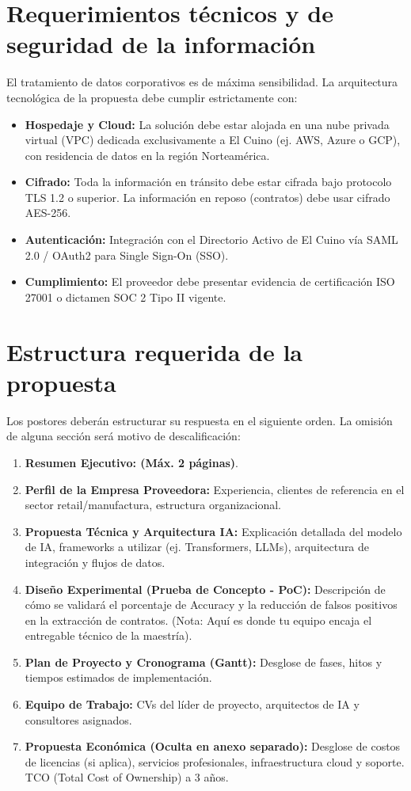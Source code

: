 \documentclass[12pt]{article}
\begin{document}
\section{Requerimientos técnicos y de seguridad de la información}
El tratamiento de datos corporativos es de máxima sensibilidad. La arquitectura
tecnológica de la propuesta debe cumplir estrictamente con:
\begin{itemize}
    \item \textbf{Hospedaje y Cloud:} La solución debe estar alojada en una nube privada virtual
(VPC) dedicada exclusivamente a El Cuino (ej. AWS, Azure o GCP), con
residencia de datos en la región Norteamérica.
    \item \textbf{Cifrado:} Toda la información en tránsito debe estar cifrada bajo protocolo TLS
1.2 o superior. La información en reposo (contratos) debe usar cifrado AES-256.
    \item \textbf{Autenticación:} Integración con el Directorio Activo de El Cuino vía SAML 2.0 /
OAuth2 para Single Sign-On (SSO).
    \item \textbf{Cumplimiento:} El proveedor debe presentar evidencia de certificación ISO
27001 o dictamen SOC 2 Tipo II vigente.    
\end{itemize}


\section{Estructura requerida de la propuesta}
Los postores deberán estructurar su respuesta en el siguiente orden. La omisión de
alguna sección será motivo de descalificación:
\begin{enumerate}
    \item \textbf{Resumen Ejecutivo: (Máx. 2 páginas)}.
    \item \textbf{Perfil de la Empresa Proveedora:} Experiencia, clientes de referencia en el
    sector retail/manufactura, estructura organizacional.
    \item \textbf{Propuesta Técnica y Arquitectura IA:} Explicación detallada del modelo de IA,
    frameworks a utilizar (ej. Transformers, LLMs), arquitectura de integración y
    flujos de datos.
    \item \textbf{Diseño Experimental (Prueba de Concepto - PoC):} Descripción de cómo se
    validará el porcentaje de Accuracy y la reducción de falsos positivos en la
    extracción de contratos. (Nota: Aquí es donde tu equipo encaja el entregable
    técnico de la maestría).
    \item \textbf{Plan de Proyecto y Cronograma (Gantt):} Desglose de fases, hitos y tiempos
    estimados de implementación.
    \item \textbf{Equipo de Trabajo:} CVs del líder de proyecto, arquitectos de IA y consultores
    asignados.
    \item \textbf{Propuesta Económica (Oculta en anexo separado):} Desglose de costos de
    licencias (si aplica), servicios profesionales, infraestructura cloud y soporte. TCO
(Total Cost of Ownership) a 3 años.
\end{enumerate}
\end{document}
